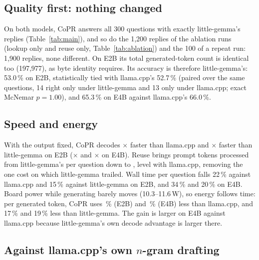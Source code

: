 \documentclass[conference]{IEEEtran}
\newcommand{\sys}{CoPR}
\newcommand{\lc}{llama.cpp}
\newcommand{\lgm}{little-gemma}
\begin{document}
\subsection{Quality first: nothing changed}
On both models, \sys{} answers all 300 questions with exactly \lgm{}'s replies
(Table~\ref{tab:main}), and so do the 1{,}200 replies of the ablation runs
(lookup only and reuse only, Table~\ref{tab:ablation}) and the 100 of a repeat
run: 1{,}900 replies, none different. On E2B its total generated-token count is identical too
(197{,}977), as byte identity requires. Its accuracy is therefore \lgm{}'s:
53.0\,\% on E2B, statistically tied with \lc{}'s 52.7\,\% (paired over the
same questions, 14 right only under \lgm{} and 13 only under \lc{}; exact
McNemar $p{=}1.00$), and 65.3\,\% on E4B against \lc{}'s 66.0\,\%.

\subsection{Speed and energy}
With the output fixed, \sys{} decodes \EtwoSpL$\times$ faster than \lc{} and
\EtwoSpG$\times$ faster than \lgm{} on E2B (\EfourSpL$\times$ and
\EfourSpG$\times$ on E4B). Reuse brings prompt tokens processed from \lgm{}'s
\EtwoPrmG{} per question down to \EtwoPrmA{}, level with \lc{}, removing the
one cost on which \lgm{} trailed. Wall time per question falls 22\,\% against
\lc{} and 15\,\% against \lgm{} on E2B, and 34\,\% and 20\,\% on E4B. Board
power while generating barely moves (10.3--11.6\,W), so energy follows time:
per generated token, \sys{} uses \EtwoJsav\,\% (E2B) and \EfourJsav\,\% (E4B)
less than \lc{}, and 17\,\% and 19\,\% less than \lgm{}. The gain is larger on
E4B against \lc{} because \lgm{}'s own decode advantage is larger there.

\subsection{Against \lc{}'s own $n$-gram drafting}\label{sec:lcngram}
\end{document}
